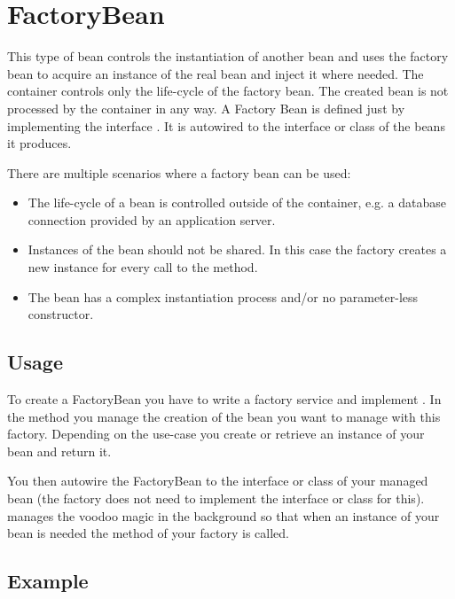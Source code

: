 \section{FactoryBean}
\label{feature:FactoryBean}
\ClearAPI

This type of bean controls the instantiation of another bean and \AMBETH{} uses the factory bean to acquire an instance of the real bean and inject it where needed. The container controls only the life-cycle of the factory bean. The created bean is not processed by the container in any way. A Factory Bean is defined just by implementing the interface . It is autowired to the interface or class of the beans it produces.

There are multiple scenarios where a factory bean can be used:

\begin{itemize}
	\item The life-cycle of a bean is controlled outside of the container, e.g. a database connection provided by an application server.
	\item Instances of the bean should not be shared. In this case the factory creates a new instance for every call to the  method.
	\item The bean has a complex instantiation process and/or no parameter-less constructor.
\end{itemize}

\subsection{Usage}

To create a FactoryBean you have to write a factory service and implement . In the  method you manage the creation of the bean you want to manage with this factory. Depending on the use-case you create or retrieve an instance of your bean and return it.

You then autowire the FactoryBean to the interface or class of your managed bean (the factory does not need to implement the interface or class for this). \AMBETH{} manages the voodoo magic in the background so that when an instance of your bean is needed the  method of your factory is called.

\subsection{Example}

